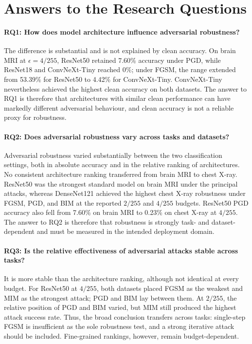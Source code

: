 \documentclass[12pt,a4paper,oneside]{report}
\begin{document}
\section{Answers to the Research Questions}

\paragraph{RQ1: How does model architecture influence adversarial robustness?}
The difference is substantial and is not explained by clean accuracy. On brain MRI at $\epsilon=4/255$, ResNet50 retained 7.60\% accuracy under PGD, while ResNet18 and ConvNeXt-Tiny reached 0\%; under FGSM, the range extended from 53.39\% for ResNet50 to 4.42\% for ConvNeXt-Tiny. ConvNeXt-Tiny nevertheless achieved the highest clean accuracy on both datasets. The answer to RQ1 is therefore that architectures with similar clean performance can have markedly different adversarial behaviour, and clean accuracy is not a reliable proxy for robustness.

\paragraph{RQ2: Does adversarial robustness vary across tasks and datasets?}
Adversarial robustness varied substantially between the two classification settings, both in absolute accuracy and in the relative ranking of architectures.
No consistent architecture ranking transferred from brain MRI to chest X-ray. ResNet50 was the strongest standard model on brain MRI under the principal attacks, whereas DenseNet121 achieved the highest chest X-ray robustness under FGSM, PGD, and BIM at the reported $2/255$ and $4/255$ budgets. ResNet50 PGD accuracy also fell from 7.60\% on brain MRI to 0.23\% on chest X-ray at $4/255$. The answer to RQ2 is therefore that robustness is strongly task- and dataset-dependent and must be measured in the intended deployment domain.

\paragraph{RQ3: Is the relative effectiveness of adversarial attacks stable across tasks?}
It is more stable than the architecture ranking, although not identical at every budget. For ResNet50 at $4/255$, both datasets placed FGSM as the weakest and MIM as the strongest attack; PGD and BIM lay between them. At $2/255$, the relative position of PGD and BIM varied, but MIM still produced the highest attack success rate. Thus, the broad conclusion transfers across tasks: single-step FGSM is insufficient as the sole robustness test, and a strong iterative attack should be included. Fine-grained rankings, however, remain budget-dependent.
\end{document}
